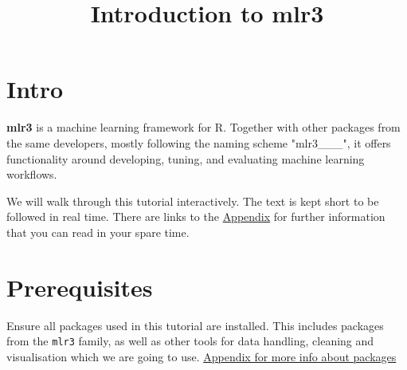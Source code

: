 \documentclass[]{article}
\title{Introduction to mlr3}
\author{}
\date{}
\begin{document}
\maketitle

{
\setcounter{tocdepth}{2}
\tableofcontents
}
\hypertarget{intro}{%
\section{Intro}\label{intro}}

\textbf{mlr3} is a machine learning framework for R. Together with other
packages from the same developers, mostly following the naming scheme
"mlr3\_\_\_", it offers functionality around developing, tuning, and
evaluating machine learning workflows.

We will walk through this tutorial interactively. The text is kept short
to be followed in real time. There are links to the
\protect\hyperlink{appendix}{Appendix} for further information that you
can read in your spare time.

\hypertarget{prerequisites}{%
\section{Prerequisites}\label{prerequisites}}

Ensure all packages used in this tutorial are installed. This includes
packages from the \texttt{mlr3} family, as well as other tools for data
handling, cleaning and visualisation which we are going to use.
\protect\hyperlink{packages}{Appendix for more info about packages}
\end{document}
